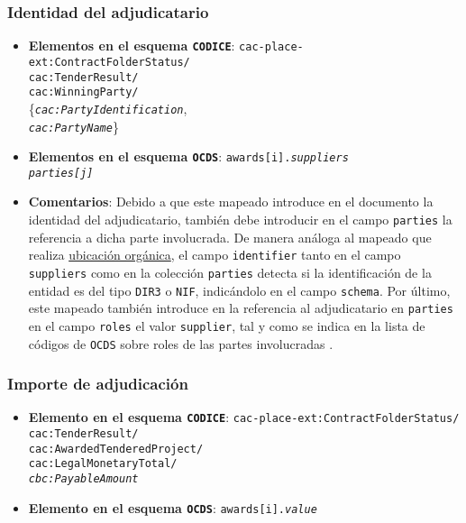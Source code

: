        \subsubsection{Identidad del adjudicatario}
            \begin{itemize}
                \item \textbf{Elementos en el esquema \texttt{CODICE}}:
                    \tabto{7.6cm} \texttt{cac-place-ext:ContractFolderStatus/} \\
                    \tabto{7.6cm} \texttt{cac:TenderResult/} \\
                    \tabto{7.6cm} \texttt{cac:WinningParty/} \\
                    \tabto{7.7cm} \{\texttt{\textit{cac:PartyIdentification}}, \\
                    \tabto{7.7cm} \texttt{\textit{cac:PartyName}}\}
                \item \textbf{Elementos en el esquema \texttt{OCDS}}:
                    \tabto{7.6cm} \texttt{awards[i].\textit{suppliers}} \\
                    \tabto{7.6cm} \texttt{\textit{parties[j]}}
                \item \textbf{Comentarios}: Debido a que este mapeado introduce en el documento la identidad del adjudicatario, también debe introducir en el campo \texttt{parties} la referencia a dicha parte involucrada. De manera análoga al mapeado que realiza  \hyperref[subsec:UbicacionOrganica]{ubicación orgánica}, el campo \texttt{identifier} tanto en el campo \texttt{suppliers} como en la colección \texttt{parties} detecta si la identificación de la entidad es del tipo \texttt{DIR3} o \texttt{NIF}, indicándolo en el campo \texttt{schema}. Por último, este mapeado también introduce en la referencia al adjudicatario en \texttt{parties} en el campo \texttt{roles} el valor \texttt{supplier}, tal y como se indica en la lista de códigos de \texttt{OCDS} sobre roles de las partes involucradas \cite{CR18}.
            \end{itemize}
            
        \subsubsection{Importe de adjudicación}
            \begin{itemize}
                \item \textbf{Elemento en el esquema \texttt{CODICE}}:
                    \tabto{7.6cm} \texttt{cac-place-ext:ContractFolderStatus/} \\
                    \tabto{7.6cm} \texttt{cac:TenderResult/} \\
                    \tabto{7.6cm} \texttt{cac:AwardedTenderedProject/} \\
                    \tabto{7.6cm} \texttt{cac:LegalMonetaryTotal/} \\
                    \tabto{7.6cm} \texttt{\textit{cbc:PayableAmount}}
                \item \textbf{Elemento en el esquema \texttt{OCDS}}:
                    \tabto{7.6cm} \texttt{awards[i].\textit{value}}
            \end{itemize}
            
